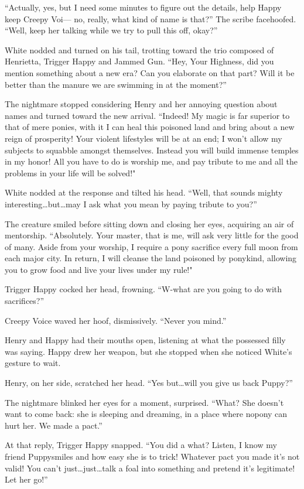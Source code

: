 ``Actually, yes, but I need some minutes to figure out the details, help Happy keep Creepy Voi--- no, really, what kind of name is that?'' The scribe facehoofed. ``Well, keep her talking while we try to pull this off, okay?''

White nodded and turned on his tail, trotting toward the trio composed of Henrietta, Trigger Happy and Jammed Gun. ``Hey, Your Highness, did you mention something about a new era? Can you elaborate on that part? Will it be better than the manure we are swimming in at the moment?''

The nightmare stopped considering Henry and her annoying question about names and turned toward the new arrival. ``Indeed! My magic is far superior to that of mere ponies, with it I can heal this poisoned land and bring about a new reign of prosperity! Your violent lifestyles will be at an end; I won't allow my subjects to squabble amongst themselves. Instead you will build immense temples in my honor! All you have to do is worship me, and pay tribute to me and all the problems in your life will be solved!"

White nodded at the response and tilted his head. ``Well, that sounds mighty interesting\dots but\dots may I ask what you mean by paying tribute to you?''

The creature smiled before sitting down and closing her eyes, acquiring an air of mentorship. ``Absolutely. Your master, that is me, will ask very little for the good of many. Aside from your worship, I require a pony sacrifice every full moon from each major city. In return, I will cleanse the land poisoned by ponykind, allowing you to grow food and live your lives under my rule!"

Trigger Happy cocked her head, frowning. ``W-what are you going to do with sacrifices?''

Creepy Voice waved her hoof, dismissively. ``Never you mind.''

Henry and Happy had their mouths open, listening at what the possessed filly was saying. Happy drew her weapon, but she stopped when she noticed White's gesture to wait.

Henry, on her side, scratched her head. ``Yes but\dots will you give us back Puppy?''

The nightmare blinked her eyes for a moment, surprised. ``What? She doesn't want to come back: she is sleeping and dreaming, in a place where nopony can hurt her. We made a pact.''

At that reply, Trigger Happy snapped. ``You did a what? Listen, I know my friend Puppysmiles and how easy she is to trick! Whatever pact you made it's not valid! You can't just\dots just\dots talk a foal into something and pretend it's legitimate! Let her go!''

